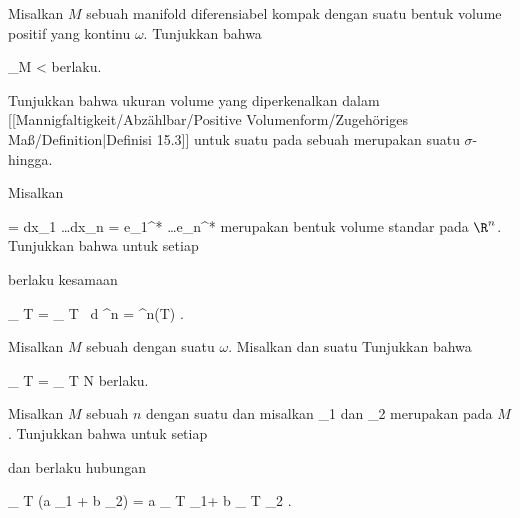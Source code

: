 \setcounter{section}{15}


{}
{

Misalkan $M$ sebuah manifold diferensiabel kompak dengan suatu bentuk volume positif yang kontinu $\omega$. Tunjukkan bahwa

\mavergleichskettedisp
{\vergleichskette
{ \int_M \omega
}
{ <} { \infty
}
{ } {
}
{ } {
}
{ } {
}
}
{}{}{}
berlaku.

}
{} {}

{}
{

Tunjukkan bahwa ukuran volume yang diperkenalkan dalam
[[Mannigfaltigkeit/Abzählbar/Positive Volumenform/Zugehöriges Maß/Definition|Definisi 15.3]]
untuk suatu
pada sebuah
merupakan suatu
$\sigma$-hingga.

}
{} {}

{}
{

Misalkan

\mavergleichskettedisp
{\vergleichskette
{ \omega
}
{ =} { dx_1 \wedge \ldots \wedge dx_n
}
{ =} { e_1^* \wedge \ldots \wedge e_n^*
}
{ } {
}
{ } {
}
}
{}{}{}
merupakan bentuk volume standar pada $\R^n$. Tunjukkan bahwa untuk setiap

 berlaku kesamaan

\mavergleichskettedisp
{\vergleichskette
{
\int_{ T  }   \omega
}
{ =} { \int_{  T  }     \,  d  \lambda^n
}
{ =} { \lambda^n(T)
}
{ } {
}
{ } {
}
}
{}{}{.}

}
{} {}

{}
{

Misalkan $M$ sebuah
dengan suatu
$\omega$. Misalkan
dan
 suatu
Tunjukkan bahwa

\mavergleichskettedisp
{\vergleichskette
{
\int_{ T  }   \omega
}
{ =} {
\int_{ T \setminus N  }   \omega
}
{ } {
}
{ } {
}
{ } {
}
}
{}{}{}
berlaku.

}
{} {}

{}
{

Misalkan $M$ sebuah
 $n$
dengan suatu
dan misalkan
\mathkor {} {\omega_1} {dan} {\omega_2} {}
merupakan
pada $M$. Tunjukkan bahwa untuk setiap

 dan
 berlaku hubungan

\mavergleichskettedisp
{\vergleichskette
{
\int_{ T  }  (a \omega_1 + b \omega_2)
}
{ =} { a
\int_{  T  }   \omega_1+ b
\int_{  T  }   \omega_2
}
{ } {
}
{ } {
}
{ } {
}
}
{}{}{.}

}
{} {}

